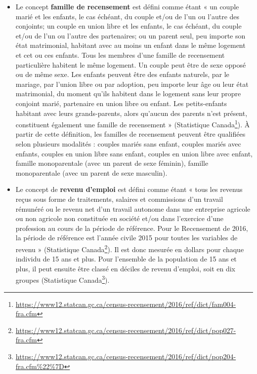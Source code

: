 \documentclass[
  11pt,
  french,
]{book}
\providecommand{\tightlist}{%
  \setlength{\itemsep}{0pt}\setlength{\parskip}{0pt}}
\renewcommand{\href}[2]{#2\footnote{\url{#1}}}
\begin{document}
\begin{itemize}
\tightlist
\item
  Le concept \textbf{famille de recensement} est défini comme étant « un couple marié et les enfants, le cas échéant, du couple et/ou de l'un ou l'autre des conjoints; un couple en union libre et les enfants, le cas échéant, du couple et/ou de l'un ou l'autre des partenaires; ou un parent seul, peu importe son état matrimonial, habitant avec au moins un enfant dans le même logement et cet ou ces enfants. Tous les membres d'une famille de recensement particulière habitent le même logement. Un couple peut être de sexe opposé ou de même sexe. Les enfants peuvent être des enfants naturels, par le mariage, par l'union libre ou par adoption, peu importe leur âge ou leur état matrimonial, du moment qu'ils habitent dans le logement sans leur propre conjoint marié, partenaire en union libre ou enfant. Les petits-enfants habitant avec leurs grands-parents, alors qu'aucun des parents n'est présent, constituent également une famille de recensement » (\href{https://www12.statcan.gc.ca/census-recensement/2016/ref/dict/fam004-fra.cfm}{Statistique Canada}). À partir de cette définition, les familles de recensement peuvent être qualifiées selon plusieurs modalités : couples mariés sans enfant, couples mariés avec enfants, couples en union libre sans enfant, couples en union libre avec enfant, famille monoparentale (avec un parent de sexe féminin), famille monoparentale (avec un parent de sexe masculin).
\item
  Le concept de \textbf{revenu d'emploi} est défini comme étant « tous les revenus reçus sous forme de traitements, salaires et commissions d'un travail rémunéré ou le revenu net d'un travail autonome dans une entreprise agricole ou non agricole non constituée en société et/ou dans l'exercice d'une profession au cours de la période de référence. Pour le Recensement de 2016, la période de référence est l'année civile 2015 pour toutes les variables de revenu » (\href{https://www12.statcan.gc.ca/census-recensement/2016/ref/dict/pop027-fra.cfm}{Statistique Canada}). Il est donc mesurée en dollars pour chaque individu de 15 ans et plus. Pour l'ensemble de la population de 15 ans et plus, il peut ensuite être classé en déciles de revenu d'emploi, soit en dix groupes (\href{https://www12.statcan.gc.ca/census-recensement/2016/ref/dict/pop204-fra.cfm\%22\%7D}{Statistique Canada}).
\end{itemize}
\end{document}
